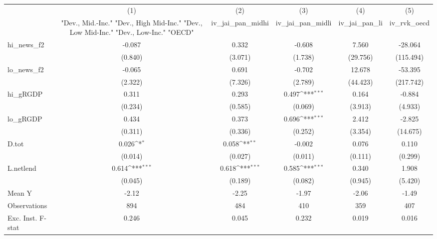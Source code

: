 {
\def\sym#1{\ifmmode^{#1}\else\(^{#1}\)\fi}
\begin{tabular}{l*{5}{c}}
\toprule
            &\multicolumn{1}{c}{(1)}&\multicolumn{1}{c}{(2)}&\multicolumn{1}{c}{(3)}&\multicolumn{1}{c}{(4)}&\multicolumn{1}{c}{(5)}\\
            &\multicolumn{1}{c}{ "Dev., Mid.-Inc." "Dev., High Mid-Inc." "Dev., Low Mid-Inc." "Dev., Low-Inc." "OECD" }&\multicolumn{1}{c}{iv\_jai\_pan\_midhi}&\multicolumn{1}{c}{iv\_jai\_pan\_midli}&\multicolumn{1}{c}{iv\_jai\_pan\_li}&\multicolumn{1}{c}{iv\_rvk\_oecd}\\
\midrule
hi\_news\_f2  &      -0.087         &       0.332         &      -0.608         &       7.560         &     -28.064         \\
            &     (0.840)         &     (3.071)         &     (1.738)         &    (29.756)         &   (115.494)         \\
\addlinespace
lo\_news\_f2  &      -0.065         &       0.691         &      -0.702         &      12.678         &     -53.395         \\
            &     (2.322)         &     (7.326)         &     (2.789)         &    (44.423)         &   (217.742)         \\
\addlinespace
hi\_gRGDP    &       0.311         &       0.293         &       0.497\sym{***}&       0.164         &      -0.884         \\
            &     (0.234)         &     (0.585)         &     (0.069)         &     (3.913)         &     (4.933)         \\
\addlinespace
lo\_gRGDP    &       0.434         &       0.373         &       0.696\sym{***}&       2.412         &      -2.825         \\
            &     (0.311)         &     (0.336)         &     (0.252)         &     (3.354)         &    (14.675)         \\
\addlinespace
D.tot       &       0.026\sym{*}  &       0.058\sym{**} &      -0.002         &       0.076         &       0.110         \\
            &     (0.014)         &     (0.027)         &     (0.011)         &     (0.111)         &     (0.299)         \\
\addlinespace
L.netlend   &       0.614\sym{***}&       0.618\sym{***}&       0.585\sym{***}&       0.340         &       1.908         \\
            &     (0.045)         &     (0.189)         &     (0.082)         &     (0.945)         &     (5.420)         \\
\midrule
Mean Y      &       -2.12         &       -2.25         &       -1.97         &       -2.06         &       -1.49         \\
Observations&         894         &         484         &         410         &         359         &         407         \\
Exc. Inst. F-stat&       0.246         &       0.045         &       0.232         &       0.019         &       0.016         \\
\bottomrule
\end{tabular}
}
